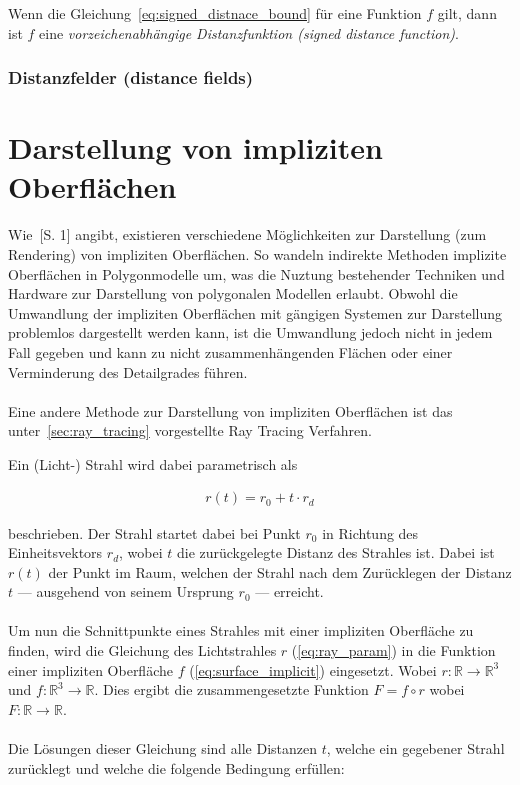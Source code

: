 Wenn die Gleichung~\ref{eq:signed_distnace_bound} für eine Funktion $f$ gilt,
dann ist $f$ eine \textit{vorzeichenabhängige Distanzfunktion (signed distance
    function)}.

\subsubsection{Distanzfelder (distance fields)}
\label{ssubsec:distance_fields}


\section{Darstellung von impliziten Oberflächen}
\label{sec:rendering_implicit_surfaces}

Wie~\cite{hart_sphere_1994}[S. 1] angibt, existieren verschiedene Möglichkeiten
zur Darstellung (zum Rendering) von impliziten Oberflächen. So wandeln
indirekte Methoden implizite Oberflächen in Polygonmodelle um, was die Nuztung
bestehender Techniken und Hardware zur Darstellung von polygonalen Modellen
erlaubt. Obwohl die Umwandlung der impliziten Oberflächen mit gängigen Systemen
zur Darstellung problemlos dargestellt werden kann, ist die Umwandlung jedoch nicht
in jedem Fall gegeben und kann zu nicht zusammenhängenden Flächen oder einer
Verminderung des Detailgrades führen.\\
\\
Eine andere Methode zur Darstellung von impliziten Oberflächen ist das
unter~\ref{sec:ray_tracing} vorgestellte Ray Tracing Verfahren.

Ein (Licht-) Strahl wird dabei parametrisch als

\begin{gather}\label{eq:ray_param}
    r(t) = r_{0} + t \cdot r_{d}
\end{gather}

beschrieben. Der Strahl startet dabei bei Punkt $r_{0}$ in Richtung des
Einheitsvektors $r_{d}$, wobei $t$ die zurückgelegte Distanz des Strahles ist.
Dabei ist $r(t)$ der Punkt im Raum, welchen der Strahl nach dem Zurücklegen der
Distanz $t$ --- ausgehend von seinem Ursprung $r_{0}$ --- erreicht.\\
\\
Um nun die Schnittpunkte eines Strahles mit einer impliziten Oberfläche zu finden, wird die Gleichung des Lichtstrahles $r$ (\ref{eq:ray_param}) in die Funktion einer impliziten Oberfläche $f$ (\ref{eq:surface_implicit}) eingesetzt. Wobei $r : \mathbb{R} \to \mathbb{R}^{3}$ und $f : \mathbb{R}^{3} \to \mathbb{R}$. Dies ergibt die zusammengesetzte Funktion $F = f \circ r$ wobei $F : \mathbb{R} \to \mathbb{R}$.\\
\\
Die Lösungen dieser Gleichung sind alle Distanzen $t$, welche ein gegebener Strahl zurücklegt und welche die folgende Bedingung erfüllen:

